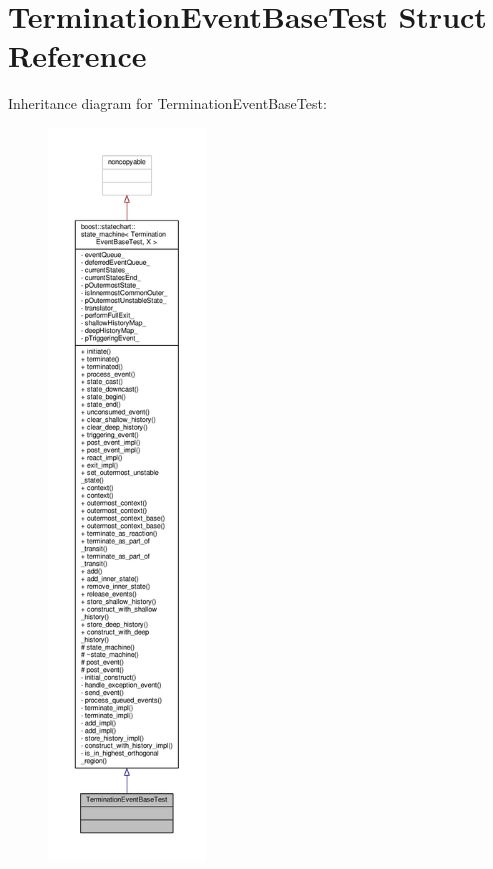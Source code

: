 \hypertarget{struct_termination_event_base_test}{}\section{Termination\+Event\+Base\+Test Struct Reference}
\label{struct_termination_event_base_test}


Inheritance diagram for Termination\+Event\+Base\+Test\+:
\nopagebreak
\begin{figure}[H]
\begin{center}
\leavevmode
\includegraphics[height=550pt]{struct_termination_event_base_test__inherit__graph}
\end{center}
\end{figure}


